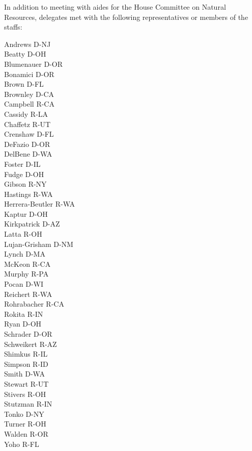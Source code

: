\noindent
In addition to meeting with aides for the House Committee on Natural Resources,
delegates met with the following representatives or members of the staffs:

\begin{multicols}{3}
\noindent
Andrews D-NJ \\
Beatty D-OH \\
Blumenauer D-OR \\
Bonamici D-OR \\
Brown D-FL \\
Brownley D-CA \\
Campbell R-CA \\
Cassidy R-LA \\
Chaffetz R-UT \\
Crenshaw D-FL \\
DeFazio D-OR \\
DelBene D-WA \\
Foster D-IL \\
Fudge D-OH \\
Gibson R-NY \\
Hastings R-WA \\
Herrera-Beutler R-WA \\
Kaptur D-OH \\
Kirkpatrick D-AZ \\
Latta R-OH \\
Lujan-Grisham D-NM \\
Lynch D-MA \\
McKeon R-CA \\
Murphy R-PA \\
Pocan D-WI \\
Reichert R-WA \\
Rohrabacher R-CA \\
Rokita R-IN \\
Ryan D-OH \\
Schrader D-OR \\
Schweikert R-AZ \\
Shimkus R-IL \\
Simpson R-ID \\
Smith D-WA \\
Stewart R-UT \\
Stivers R-OH \\
Stutzman R-IN \\
Tonko D-NY \\
Turner R-OH \\
Walden R-OR \\
Yoho R-FL \\
\end{multicols}
